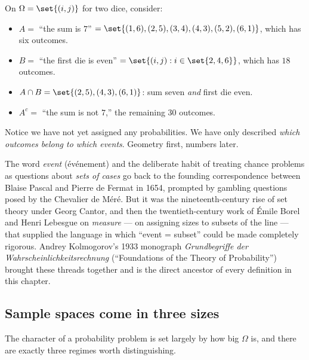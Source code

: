 \begin{example}
\label{ch03:ex-two-dice-events}
On $\Omega = \set{(i,j)}$ for two dice, consider:
\begin{itemize}
\item $A = $ ``the sum is $7$'' $= \set{(1,6),(2,5),(3,4),(4,3),(5,2),(6,1)}$,
which has six outcomes.
\item $B = $ ``the first die is even'' $= \set{(i,j): i \in \set{2,4,6}}$, which
has $18$ outcomes.
\item $A \cap B = \set{(2,5),(4,3),(6,1)}$: sum seven \emph{and} first die even.
\item $A^c = $ ``the sum is not $7$,'' the remaining $30$ outcomes.
\end{itemize}
Notice we have not yet assigned any probabilities. We have only described
\emph{which outcomes belong to which events}. Geometry first, numbers later.
\end{example}

\begin{historybox}
The word \emph{event} (\'ev\'enement) and the deliberate habit of treating chance
problems as questions about \emph{sets of cases} go back to the founding
correspondence between Blaise Pascal and Pierre de Fermat in 1654, prompted by
gambling questions posed by the Chevalier de M\'er\'e. But it was the
nineteenth-century rise of set theory under Georg Cantor, and then the
twentieth-century work of \'Emile Borel and Henri Lebesgue on \emph{measure} ---
on assigning sizes to subsets of the line --- that supplied the language in which
``event = subset'' could be made completely rigorous. Andrey Kolmogorov's 1933
monograph \emph{Grundbegriffe der Wahrscheinlichkeitsrechnung} (``Foundations of
the Theory of Probability'') brought these threads together and is the direct
ancestor of every definition in this chapter.
\end{historybox}

\subsection{Sample spaces come in three sizes}
\label{ch03:three-sizes}

The character of a probability problem is set largely by how big $\Omega$ is, and
there are exactly three regimes worth distinguishing.

